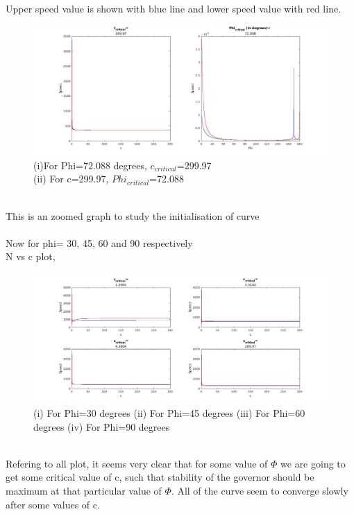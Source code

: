 \documentclass[15pt,a4paper,oneside]{article}
\begin{document}
Upper speed value is shown with blue line and lower speed value with red line.
\begin{figure}[h]
	\centerline{\includegraphics[scale=0.4]{Results.jpg}}
	\caption{(i)For Phi=72.088 degrees, $c_{critical}$=299.97\\(ii) For c=299.97, $Phi_{critical}$=72.088}
	\label{fig}
	
\end{figure}\\[3cm]
This is an zoomed graph to study the initialisation of curve\\
\pagebreak
\\[2cm]
Now for phi= 30, 45, 60 and 90 respectively\\
N vs c plot,
\begin{figure}[h]
	\centerline{\includegraphics[scale=0.4]{critical.jpg}}
	\caption{(i) For Phi=30 degrees (ii) For Phi=45 degrees (iii) For Phi=60 degrees (iv) For Phi=90 degrees}
	\label{fig}
\end{figure}\\[0.5cm]
Refering to all plot, it seems very clear that for some value of $\Phi$ we are going to get some critical value of c, such that stability of the governor should be maximum at that particular value of $\Phi$. All of the curve seem to converge slowly after some values of c.\\[2cm]
\end{document}
